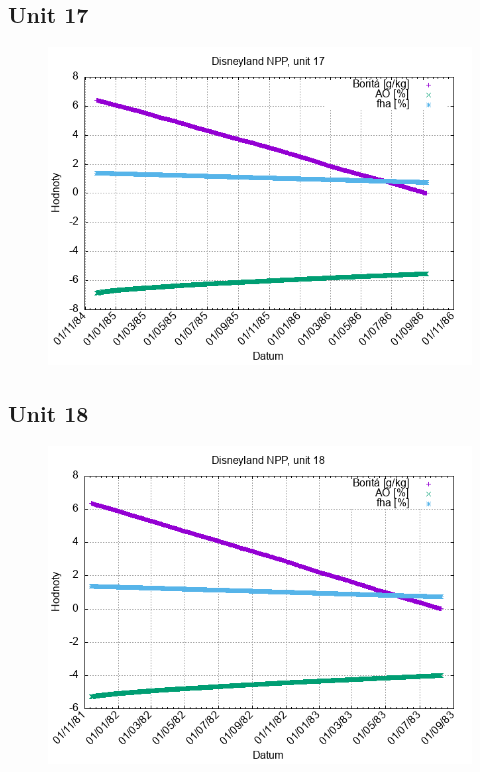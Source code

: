 \documentclass{article}
\begin{document}
\subsection*{Unit 17}
\begin{figure}[h!]
\centering
\includegraphics[width=14cm]{./grafy/Disneyland17.png}
\end{figure}
\clearpage
\subsection*{Unit 18}
\begin{figure}[h!]
\centering
\includegraphics[width=14cm]{./grafy/Disneyland18.png}
\end{figure}
\clearpage
\end{document}
